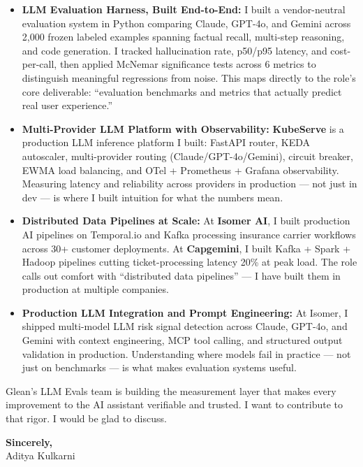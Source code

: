 \documentclass[11pt,letterpaper]{article}
\begin{document}
\vspace{4pt}
\begin{itemize}[leftmargin=*, itemsep=3pt, label={\color{GleanBlue}\faAngleRight}]
    \item \textbf{LLM Evaluation Harness, Built End-to-End:} I built a vendor-neutral evaluation system in Python comparing Claude, GPT-4o, and Gemini across 2,000 frozen labeled examples spanning factual recall, multi-step reasoning, and code generation. I tracked hallucination rate, p50/p95 latency, and cost-per-call, then applied McNemar significance tests across 6 metrics to distinguish meaningful regressions from noise. This maps directly to the role's core deliverable: ``evaluation benchmarks and metrics that actually predict real user experience.''

    \item \textbf{Multi-Provider LLM Platform with Observability:} \textbf{KubeServe} is a production LLM inference platform I built: FastAPI router, KEDA autoscaler, multi-provider routing (Claude/GPT-4o/Gemini), circuit breaker, EWMA load balancing, and OTel + Prometheus + Grafana observability. Measuring latency and reliability across providers in production --- not just in dev --- is where I built intuition for what the numbers mean.

    \item \textbf{Distributed Data Pipelines at Scale:} At \textbf{Isomer AI}, I built production AI pipelines on Temporal.io and Kafka processing insurance carrier workflows across 30+ customer deployments. At \textbf{Capgemini}, I built Kafka + Spark + Hadoop pipelines cutting ticket-processing latency 20\% at peak load. The role calls out comfort with ``distributed data pipelines'' --- I have built them in production at multiple companies.

    \item \textbf{Production LLM Integration and Prompt Engineering:} At Isomer, I shipped multi-model LLM risk signal detection across Claude, GPT-4o, and Gemini with context engineering, MCP tool calling, and structured output validation in production. Understanding where models fail in practice --- not just on benchmarks --- is what makes evaluation systems useful.
\end{itemize}
\vspace{6pt}

Glean's LLM Evals team is building the measurement layer that makes every improvement to the AI assistant verifiable and trusted. I want to contribute to that rigor. I would be glad to discuss.

\vspace{12pt}
\textbf{Sincerely,}\\[8pt]
Aditya Kulkarni
\end{document}
